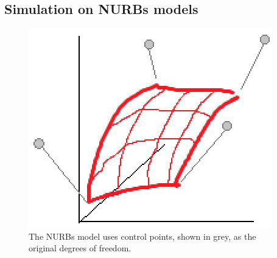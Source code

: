 \subsection{Simulation on NURBs models}

\begin{figure}[h]
  \centering
  \includegraphics[width=\linewidth]{figures/nurbs_surface}
  \caption{The NURBs model uses control points, shown in grey, as the original degrees of freedom.}
\end{figure}


